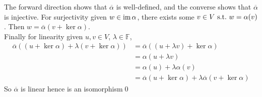 \documentclass{article}
\newcommand{\F}{\mathbb{F}}
\begin{document}
The forward direction shows that $ \overline\alpha $ is well-defined, and the converse shows that $ \overline\alpha $ is injective. For surjectivity given $ w\in\operatorname{im}\alpha $, there exists some $ v\in V \text{ s.t.\ } w=\alpha(v)$. Then $ w=\overline\alpha(v+\ker\alpha) $.\\
Finally for linearity given $ u,v\in V $, $ \lambda\in\F $,
\begin{align*}
	\overline\alpha((u+\ker\alpha)+\lambda(v+\ker\alpha))&=\overline\alpha((u+\lambda v)+\ker\alpha)\\
  &= \alpha(u+\lambda v)\\
  &= \alpha(u)+\lambda\alpha(v) \\
  &= \overline\alpha(u+\ker\alpha)+\lambda\overline\alpha(v+\ker\alpha)
\end{align*}
So $ \overline \alpha$ is linear hence is an isomorphism\qed
\end{document}
